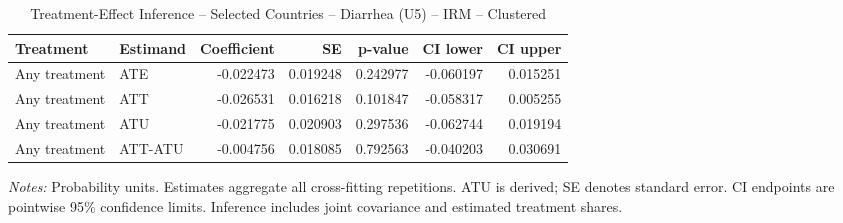 \begin{table}[htbp]
\centering
\caption{Treatment-Effect Inference -- Selected Countries -- Diarrhea (U5) -- IRM -- Clustered}
\label{tab:inference-diarrhea-IRM-clustered-selected-countries}
\scriptsize
\begin{adjustbox}{max width=\linewidth}
\begin{tabular}{llrrrrr}
\toprule
Treatment & Estimand & Coefficient & SE & p-value & CI lower & CI upper \\
\midrule
Any treatment & ATE & -0.022473 & 0.019248 & 0.242977 & -0.060197 & 0.015251 \\
Any treatment & ATT & -0.026531 & 0.016218 & 0.101847 & -0.058317 & 0.005255 \\
Any treatment & ATU & -0.021775 & 0.020903 & 0.297536 & -0.062744 & 0.019194 \\
Any treatment & ATT-ATU & -0.004756 & 0.018085 & 0.792563 & -0.040203 & 0.030691 \\
\bottomrule
\end{tabular}

\end{adjustbox}
\par\smallskip
\begin{minipage}{\linewidth}\scriptsize \textit{Notes:} Probability units. Estimates aggregate all cross-fitting repetitions. ATU is derived; SE denotes standard error. CI endpoints are pointwise 95\% confidence limits. Inference includes joint covariance and estimated treatment shares. \end{minipage}
\end{table}


